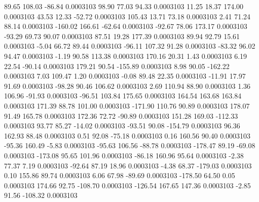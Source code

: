        89.65      108.03      -86.84     0.0003103
       98.90       77.03       94.33     0.0003103
       11.25       18.37      174.00     0.0003103
       43.53       12.33      -52.72     0.0003103
      105.43       13.71       73.18     0.0003103
        2.41       71.24       88.14     0.0003103
     -160.02      166.61      -62.64     0.0003103
      -92.67       78.06      173.17     0.0003103
      -93.29       69.73       90.07     0.0003103
       87.51       19.28      177.39     0.0003103
       89.94       92.79       15.61     0.0003103
       -5.04       66.72       89.44     0.0003103
      -96.11      107.32       91.28     0.0003103
      -83.32       96.02       94.47     0.0003103
       -1.19       90.58      113.38     0.0003103
      170.16       20.31        1.43     0.0003103
        6.19       22.54      -90.14     0.0003103
      179.21       90.54     -155.89     0.0003103
        8.98       90.05     -162.22     0.0003103
        7.03      109.47        1.20     0.0003103
       -0.08       89.48       22.35     0.0003103
      -11.91       17.97       91.69     0.0003103
      -98.28       90.46      106.62     0.0003103
        2.69      110.94       88.90     0.0003103
        1.36      106.96      -91.93     0.0003103
      -96.51      103.84      175.65     0.0003103
      164.54      163.68      163.84     0.0003103
      171.39       88.78      101.00     0.0003103
     -171.90      110.76       90.89     0.0003103
      178.07       91.49      165.78     0.0003103
      172.36       72.72      -90.89     0.0003103
      151.28      169.03     -112.33     0.0003103
       93.77       85.27      -14.02     0.0003103
      -93.51       90.08     -154.79     0.0003103
       96.36      162.93       88.48     0.0003103
        0.51       92.08      -75.18     0.0003103
        0.16      160.56       90.40     0.0003103
      -95.36      160.49       -5.83     0.0003103
      -95.63      106.56      -88.78     0.0003103
     -178.47       89.19      -69.08     0.0003103
     -173.08       95.65      101.96     0.0003103
      -86.18      160.96       95.64     0.0003103
       -2.38       77.37        7.19     0.0003103
      -92.64       87.19       18.96     0.0003103
       -4.38       68.37     -179.03     0.0003103
        0.10      155.86       89.74     0.0003103
        6.06       67.98      -89.69     0.0003103
     -178.50       64.50        0.05     0.0003103
      174.66       92.75     -108.70     0.0003103
     -126.54      167.65      147.36     0.0003103
       -2.85       91.56     -108.32     0.0003103
